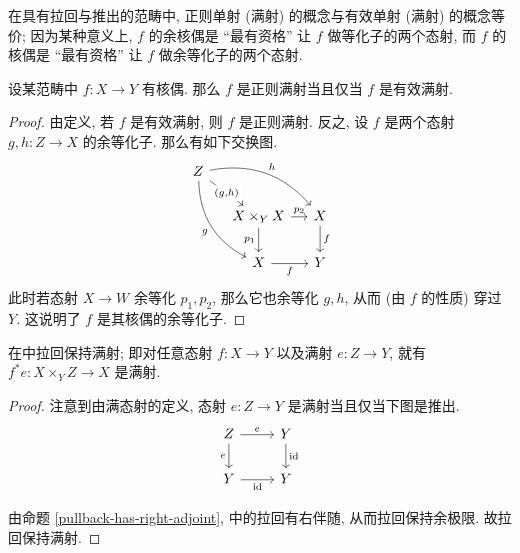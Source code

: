 在具有拉回与推出的范畴中, 正则单射 (满射) 的概念与有效单射 (满射) 的概念等价; 因为某种意义上, $f$ 的余核偶是 ``最有资格'' 让 $f$ 做等化子的两个态射, 而 $f$ 的核偶是 ``最有资格'' 让 $f$ 做余等化子的两个态射.

\begin{prop}
	{}
	设某范畴中 $f\colon X\to Y$ 有核偶. 那么 $f$ 是正则满射当且仅当 $f$ 是有效满射.
\end{prop}

\begin{proof}
	由定义, 若 $f$ 是有效满射, 则 $f$ 是正则满射.
	反之, 设 $f$ 是两个态射 $g,h\colon Z\to X$ 的余等化子. 那么有如下交换图.
	\[\begin{tikzcd}[ampersand replacement=\&,column sep=small]
		Z \\
		\& {X\times_Y X} \& X \\
		\& X \& Y
		\arrow["g"', bend right, from=1-1, to=3-2]
		\arrow["h", bend left, from=1-1, to=2-3]
		\arrow["{(g,h)}"{description}, from=1-1, to=2-2]
		\arrow["{p_1}"', from=2-2, to=3-2]
		\arrow["{p_2}", from=2-2, to=2-3]
		\arrow["f"', from=3-2, to=3-3]
		\arrow["f", from=2-3, to=3-3]
	\end{tikzcd}\]
	此时若态射 $X\to W$ 余等化 $p_1,p_2$, 那么它也余等化 $g,h$, 从而 (由 $f$ 的性质) 穿过 $Y$. 这说明了 $f$ 是其核偶的余等化子.
\end{proof}


\begin{prop}
	{}
	在\topos{}中拉回保持满射; 即对任意态射 $f\colon X \to Y$ 以及满射 $e\colon Z \to Y$, 就有 $f^*e\colon X\times_Y Z \to X$ 是满射.
\end{prop}

\begin{proof}
	注意到由满态射的定义, 态射 $e\colon Z \to Y$ 是满射当且仅当下图是推出.
	\[\begin{tikzcd}[ampersand replacement=\&]
		Z \& Y \\
		Y \& Y
		\arrow["e", from=1-1, to=1-2]
		\arrow["e"', from=1-1, to=2-1]
		\arrow["{\operatorname{id}}"', from=2-1, to=2-2]
		\arrow["{\operatorname{id}}", from=1-2, to=2-2]
	\end{tikzcd}\]
	
	由命题 \ref{pullback-has-right-adjoint}, \topos{}中的拉回有右伴随, 从而拉回保持余极限. 故拉回保持满射.
\end{proof}

